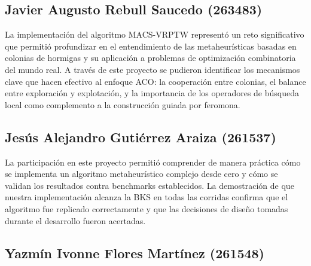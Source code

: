 \documentclass[12pt, letterpaper]{article}
\begin{document}

\subsection{Javier Augusto Rebull Saucedo (263483)}
\label{subsec:conclusion_javier}


La implementación del algoritmo MACS-VRPTW representó un reto significativo que permitió profundizar en el entendimiento de las metaheurísticas basadas en colonias de hormigas y su aplicación a problemas de optimización combinatoria del mundo real. A través de este proyecto se pudieron identificar los mecanismos clave que hacen efectivo al enfoque ACO: la cooperación entre colonias, el balance entre exploración y explotación, y la importancia de los operadores de búsqueda local como complemento a la construcción guiada por feromona.


\subsection{Jesús Alejandro Gutiérrez Araiza (261537)}
\label{subsec:conclusion_jesus}


La participación en este proyecto permitió comprender de manera práctica cómo se implementa un algoritmo metaheurístico complejo desde cero y cómo se validan los resultados contra benchmarks establecidos. La demostración de que nuestra implementación alcanza la BKS en todas las corridas confirma que el algoritmo fue replicado correctamente y que las decisiones de diseño tomadas durante el desarrollo fueron acertadas.


\subsection{Yazmín Ivonne Flores Martínez (261548)}
\label{subsec:conclusion_yazmin}

\end{document}

